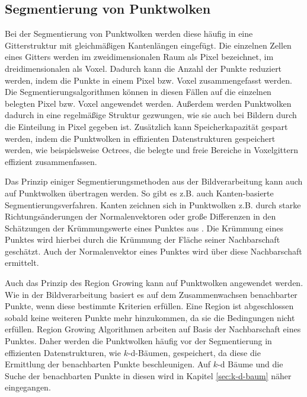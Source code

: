 \subsection[Segmentierung von Punktwolken (Schmelzer)]{Segmentierung von Punktwolken}

Bei der Segmentierung von Punktwolken werden diese häufig in eine Gitterstruktur mit gleichmäßigen Kantenlängen eingefügt. Die einzelnen Zellen eines Gitters werden im zweidimensionalen Raum als Pixel bezeichnet, im dreidimensionalen als Voxel. Dadurch kann die Anzahl der Punkte reduziert werden, indem die Punkte in einem Pi\-xel bzw. Voxel zusammengefasst werden. Die Segmentierungsalgorithmen können in diesen Fällen auf die einzelnen belegten Pixel bzw. Voxel angewendet werden. Außerdem werden Punktwolken dadurch in eine regelmäßige Struktur gezwungen, wie sie auch bei Bildern durch die Einteilung in Pixel gegeben ist. Zusätzlich kann Speicherkapazität gespart werden, indem die Punktwolken in effizienten Datenstrukturen ge\-spei\-chert werden, wie beispielsweise Octrees, die belegte und freie Bereiche in Voxelgittern effizient zusammenfassen.

Das Prinzip einiger Segmentierungsmethoden aus der Bildverarbeitung kann auch auf Punktwolken übertragen werden. So gibt es z.B. auch Kanten-basierte Segmentierungsverfahren. Kanten zeichnen sich in Punktwolken z.B. durch starke Richtungsänderungen der Normalenvektoren oder große Differenzen in den Schätzungen der Krümmungswerte eines Punktes aus \cite{Wilke2002}. Die Krümmung eines Punktes wird hierbei durch die Krümmung der Fläche seiner Nachbarschaft geschätzt. Auch der Normalenvektor eines Punktes wird über diese Nachbarschaft ermittelt. 

Auch das Prinzip des Region Growing kann auf Punktwolken angewendet werden. Wie in der Bildverarbeitung basiert es auf dem Zusammenwachsen benachbarter Punkte, wenn diese bestimmte Kriterien erfüllen. Eine Region ist abgeschlossen sobald keine weiteren Punkte mehr hinzukommen, da sie die Bedingungen nicht erfüllen. Region Growing Algorithmen arbeiten auf Basis der Nachbarschaft eines Punktes. Daher werden die Punktwolken häufig vor der Segmentierung in effizienten Datenstrukturen, wie $k$-d-Bäumen, gespeichert, da diese die Ermittlung der benachbarten Punkte beschleunigen. Auf $k$-d Bäume und die Suche der benachbarten Punkte in diesen wird in Kapitel \ref{sec:k-d-baum} näher eingegangen. 

